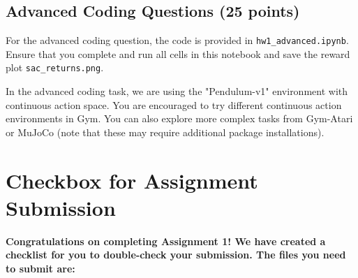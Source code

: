 \documentclass[letterpaper,12pt,addpoints]{exam}
\begin{document}
\subsection{Advanced Coding Questions (25 points)}
For the advanced coding question, the code is provided in \texttt{hw1\_advanced.ipynb}. Ensure that you complete and run all cells in this notebook and save the reward plot \texttt{sac\_returns.png}.

In the advanced coding task, we are using the "Pendulum-v1" environment with continuous action space. You are encouraged to try different continuous action environments in Gym. You can also explore more complex tasks from Gym-Atari or MuJoCo (note that these may require additional package installations).

\begin{questions}
\end{questions}

\newpage
\section*{Checkbox for Assignment Submission}

\textbf{Congratulations on completing Assignment 1! We have created a checklist for you to double-check your submission. The files you need to submit are:}
\end{document}
